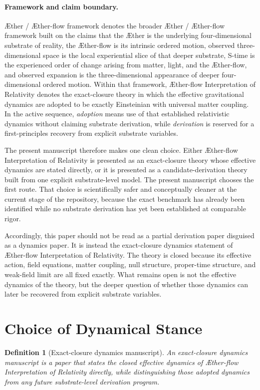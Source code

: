 \documentclass[11pt]{article}
\newcommand{\Aether}{\AE{}ther}
\newcommand{\Aflow}{\AE{}ther-flow}
\newcommand{\TheoryName}{\Aflow{} Interpretation of Relativity}
\newcommand{\TheoryProgram}{\Aether{} / \Aflow{} framework}
\newtheorem{definition}{Definition}
\begin{document}
\paragraph{Framework and claim boundary.}
\TheoryProgram{} denotes the broader \Aether{} / \Aflow{} framework built on the claims that the \Aether{} is the underlying four-dimensional substrate of reality, the \Aflow{} is its intrinsic ordered motion, observed three-dimensional space is the local experiential slice of that deeper substrate, S-time is the experienced order of change arising from matter, light, and the \Aflow{}, and observed expansion is the three-dimensional appearance of deeper four-dimensional ordered motion. Within that framework, \TheoryName{} denotes the exact-closure theory in which the effective gravitational dynamics are adopted to be exactly Einsteinian with universal matter coupling. In the active sequence, \emph{adoption} means use of that established relativistic dynamics without claiming substrate derivation, while \emph{derivation} is reserved for a first-principles recovery from explicit substrate variables.

The present manuscript therefore makes one clean choice. Either \TheoryName{} is presented as an exact-closure theory whose effective dynamics are stated directly, or it is presented as a candidate-derivation theory built from one explicit substrate-level model. The present manuscript chooses the first route. That choice is scientifically safer and conceptually cleaner at the current stage of the repository, because the exact benchmark has already been identified while no substrate derivation has yet been established at comparable rigor.

Accordingly, this paper should not be read as a partial derivation paper disguised as a dynamics paper. It is instead the exact-closure dynamics statement of \TheoryName{}. The theory is closed because its effective action, field equations, matter coupling, null structure, proper-time structure, and weak-field limit are all fixed exactly. What remains open is not the effective dynamics of the theory, but the deeper question of whether those dynamics can later be recovered from explicit substrate variables.

\section{Choice of Dynamical Stance}

\begin{definition}[Exact-closure dynamics manuscript]
An exact-closure dynamics manuscript is a paper that states the closed effective dynamics of \TheoryName{} directly, while distinguishing those adopted dynamics from any future substrate-level derivation program.
\end{definition}
\end{document}
